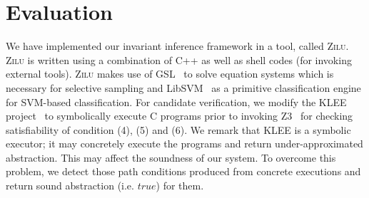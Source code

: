 
\section{Evaluation} %
\label{sec:evaluations}
We have implemented our invariant inference framework in a tool, called \textsc{Zilu}. \textsc{Zilu} is written using a combination of C++ as well as shell codes (for invoking external tools).
\textsc{Zilu} makes use of GSL~\cite{gough2009gnu} to solve equation systems which is necessary for selective sampling and
 LibSVM~\cite{chang2011libsvm} as a primitive classification engine for
SVM-based classification. %
For candidate verification, we %
modify the KLEE project~\cite{cadar2008klee} to
symbolically execute
 C programs %
prior to invoking Z3~\cite{de2008z3} for checking satisfiability of
condition (4), (5) and (6).
 We remark that KLEE is a symbolic executor; it may
concretely execute the programs and return
 under-approximated
abstraction. This may affect the soundness of our system.
To overcome this problem, we detect those path conditions produced from
concrete executions
and return sound abstraction (i.e. $true$) for them.


